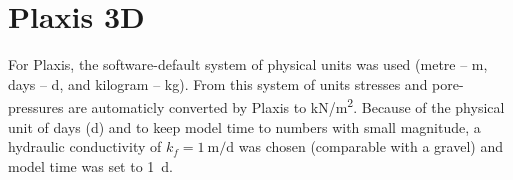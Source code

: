

\section{Plaxis 3D}

For Plaxis, the software-default system of physical units was used (metre
-- \unit{\metre}, days -- \unit{\day}, and kilogram -- \unit{\kilogram}).
From this system of units stresses and pore-pressures are automaticly converted
by Plaxis to \unit[per-mode = symbol]{\kilo\newton\per\square\metre}. Because
of the physical unit of days (\unit{\day}) and to keep model time to numbers
with small magnitude, a hydraulic conductivity of
$k_f = \qty[per-mode = symbol]{1}{\metre\per\day}$ was chosen (comparable with
a gravel) and model time was set to \qty{1}{\day}.

